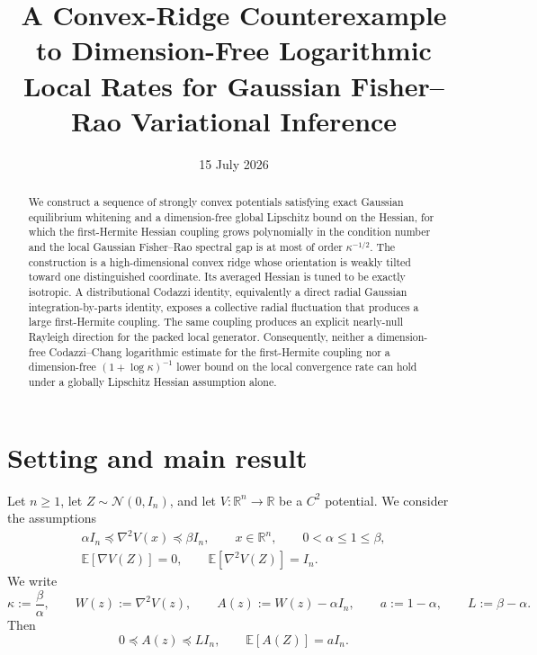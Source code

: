 \documentclass[11pt]{article}
\title{A Convex-Ridge Counterexample to Dimension-Free Logarithmic Local Rates for Gaussian Fisher--Rao Variational Inference}
\author{}
\date{15 July 2026}
\theoremstyle{plain}
\theoremstyle{definition}
\theoremstyle{remark}
\newcommand{\R}{\mathbb{R}}
\newcommand{\E}{\mathbb{E}}
\newcommand{\N}{\mathcal{N}}
\newcommand{\Id}{I}
\newcommand{\1}{\mathbf{1}}
\begin{document}
\maketitle

\begin{abstract}
We construct a sequence of strongly convex potentials satisfying exact Gaussian
equilibrium whitening and a dimension-free global Lipschitz bound on the Hessian,
for which the first-Hermite Hessian coupling grows polynomially in the condition
number and the local Gaussian Fisher--Rao spectral gap is at most of order
$\kappa^{-1/2}$. The construction is a high-dimensional convex ridge whose
orientation is weakly tilted toward one distinguished coordinate. Its averaged
Hessian is tuned to be exactly isotropic. A distributional Codazzi identity,
equivalently a direct radial Gaussian integration-by-parts identity, exposes a
collective radial fluctuation that produces a large first-Hermite coupling. The
same coupling produces an explicit nearly-null
Rayleigh direction for the packed local generator. Consequently, neither a
dimension-free Codazzi--Chang logarithmic estimate for the first-Hermite coupling
nor a dimension-free $(1+\log\kappa)^{-1}$ lower bound on the local convergence
rate can hold under a globally Lipschitz Hessian assumption alone.
\end{abstract}

\tableofcontents

\section{Setting and main result}

Let $n\geq1$, let $Z\sim\N(0,\Id_n)$, and let
$V:\R^n\to\R$ be a $C^2$ potential. We consider the assumptions
\begin{align}
    \alpha\Id_n
    \preceq
    \nabla^2V(x)
    \preceq
    \beta\Id_n,
    \qquad x\in\R^n,
    \qquad
    0<\alpha\leq1\leq\beta,
    \label{eq:H1}\\
    \E[\nabla V(Z)]=0,
    \qquad
    \E[\nabla^2V(Z)]=\Id_n.
    \label{eq:H2}
\end{align}
We write
\[
    \kappa:=\frac{\beta}{\alpha},
    \qquad
    W(z):=\nabla^2V(z),
    \qquad
    A(z):=W(z)-\alpha\Id_n,
    \qquad
    a:=1-\alpha,
    \qquad
    L:=\beta-\alpha.
\]
Then
\[
    0\preceq A(z)\preceq L\Id_n,
    \qquad
    \E[A(Z)]=a\Id_n.
\]
\end{document}
